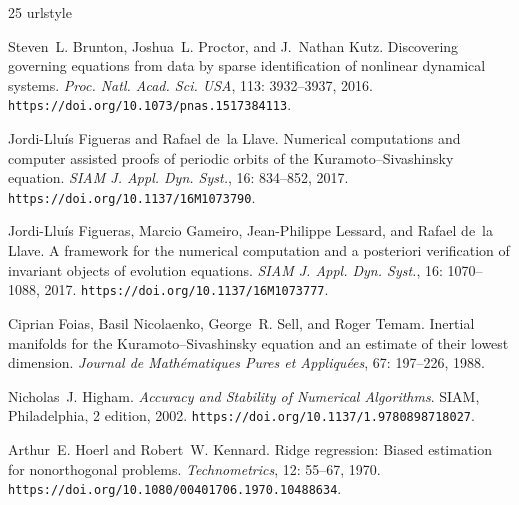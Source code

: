 \documentclass[11pt]{article}
\begin{document}
\FloatBarrier
\renewcommand{\bibfont}{\small}
\begin{thebibliography}{25}
\providecommand{\natexlab}[1]{#1}
\providecommand{\url}[1]{\texttt{#1}}
\expandafter\ifx\csname urlstyle\endcsname\relax
  \providecommand{\doi}[1]{doi: #1}\else
  \providecommand{\doi}{doi: \begingroup \urlstyle{rm}\Url}\fi

Steven~L. Brunton, Joshua~L. Proctor, and J.~Nathan Kutz.
\newblock Discovering governing equations from data by sparse identification of
  nonlinear dynamical systems.
\newblock \emph{Proc. Natl. Acad. Sci. USA}, 113: 3932--3937, 2016.
\newblock \url{https://doi.org/10.1073/pnas.1517384113}.

Jordi-Llu\'{i}s Figueras and Rafael de~la Llave.
\newblock Numerical computations and computer assisted proofs of periodic
  orbits of the {Kuramoto--Sivashinsky} equation.
\newblock \emph{SIAM J. Appl. Dyn. Syst.}, 16: 834--852, 2017.
\newblock \url{https://doi.org/10.1137/16M1073790}.

Jordi-Llu\'{i}s Figueras, Marcio Gameiro, Jean-Philippe Lessard, and Rafael
  de~la Llave.
\newblock A framework for the numerical computation and a posteriori
  verification of invariant objects of evolution equations.
\newblock \emph{SIAM J. Appl. Dyn. Syst.}, 16: 1070--1088, 2017.
\newblock \url{https://doi.org/10.1137/16M1073777}.

Ciprian Foias, Basil Nicolaenko, George~R. Sell, and Roger Temam.
\newblock Inertial manifolds for the {Kuramoto--Sivashinsky} equation and an
  estimate of their lowest dimension.
\newblock \emph{Journal de Math\'ematiques Pures et Appliqu\'ees}, 67:
  197--226, 1988.

Nicholas~J. Higham.
\newblock \emph{Accuracy and Stability of Numerical Algorithms}.
\newblock SIAM, Philadelphia, 2 edition, 2002.
\newblock \url{https://doi.org/10.1137/1.9780898718027}.

Arthur~E. Hoerl and Robert~W. Kennard.
\newblock Ridge regression: Biased estimation for nonorthogonal problems.
\newblock \emph{Technometrics}, 12: 55--67, 1970.
\newblock \url{https://doi.org/10.1080/00401706.1970.10488634}.


\end{thebibliography}
\end{document}
